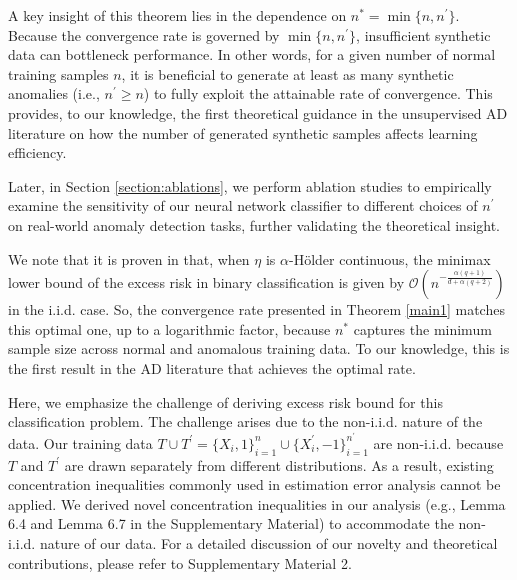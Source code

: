 \documentclass{article}
\begin{document}
A key insight of this theorem lies in the dependence on $n^* = \min\{n,n^\prime\}$. Because the convergence rate is governed by $\min\{n,n^\prime\}$, insufficient synthetic data can bottleneck performance. In other words, for a given number of normal training samples $n$, it is beneficial to generate at least as many synthetic anomalies (i.e., $n^\prime \geq n$) to fully exploit the attainable rate of convergence. This provides, to our knowledge, the first theoretical guidance in the unsupervised AD literature on how the number of generated synthetic samples affects learning efficiency.

Later, in Section \ref{section:ablations}, we perform ablation studies to empirically examine the sensitivity of our neural network classifier to different choices of $n^\prime$ on real-world anomaly detection tasks, further validating the theoretical insight.

We note that 
it is proven in \citep{audibert2007fast, kim2021fast} that, when $\eta$ is $\alpha$-Hölder continuous, the minimax lower bound of the excess risk in binary classification is given by $\mathcal{O}\left( n^{-\frac{\alpha(q+1)}{d+\alpha(q+2)}}\right)$ in the i.i.d. case.
So, the convergence rate presented in Theorem \ref{main1} matches this optimal one, up to a logarithmic factor, because $n^*$ captures the minimum sample size across normal and anomalous training data. To our knowledge, this is the first result in the AD literature that
achieves the optimal rate. 




Here, we emphasize the challenge of deriving excess risk bound for this classification problem.
The challenge arises due to the non-i.i.d. nature of the data. Our training data $T\cup T^\prime = \{X_i, 1\}_{i=1}^n \cup  \{X_i^\prime, -1\}_{i=1}^{n^\prime}$ are non-i.i.d. because $T$ and $T^\prime$ are drawn separately from different distributions. As a result, existing concentration inequalities commonly used in estimation error analysis cannot be applied. We derived novel concentration inequalities in our analysis (e.g., Lemma 6.4 and Lemma 6.7 in the Supplementary Material) to accommodate the non-i.i.d. nature of our data. For a detailed discussion of our novelty and theoretical contributions, please refer to  Supplementary Material 2.
\end{document}
